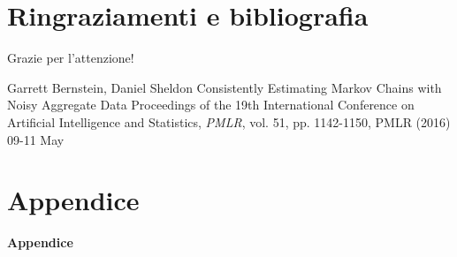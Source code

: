 \documentclass[10pt,xcolor={table,dvipsnames}]{beamer} 		%
\theoremstyle{plain}					%
\theoremstyle{definition}
\theoremstyle{remark}
\begin{document}
	

    
\section{Ringraziamenti e bibliografia}
    \begin{frame}
        \begin{center}
            \Huge{Grazie per l'attenzione!}
        \end{center}
    \end{frame}

	\begin{frame}{\refname}
		\begin{thebibliography}{9}
			 Garrett Bernstein, Daniel Sheldon
			\newblock Consistently Estimating Markov Chains with Noisy Aggregate Data
			\newblock Proceedings of the 19th International Conference on Artificial Intelligence and Statistics, \emph{PMLR}, vol. 51, pp. 1142-1150, PMLR (2016) 09-11 May

		\end{thebibliography}
	\end{frame}



\section*{Appendice}
	\begin{frame}
		\begin{center}
			\Huge{\textbf{Appendice}}
		\end{center}
	\end{frame}
\end{document}
